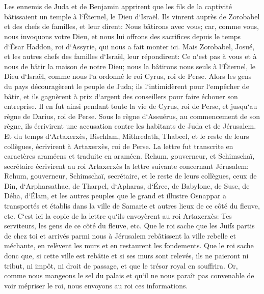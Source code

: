 \chapter{}

\verse Les ennemis de Juda et de Benjamin apprirent que les fils de la captivité bâtissaient un temple à l`Éternel, le Dieu d`Israël. 
\verse Ils vinrent auprès de Zorobabel et des chefs de familles, et leur dirent: Nous bâtirons avec vous; car, comme vous, nous invoquons votre Dieu, et nous lui offrons des sacrifices depuis le temps d`Ésar Haddon, roi d`Assyrie, qui nous a fait monter ici. 
\verse Mais Zorobabel, Josué, et les autres chefs des familles d`Israël, leur répondirent: Ce n`est pas à vous et à nous de bâtir la maison de notre Dieu; nous la bâtirons nous seuls à l`Éternel, le Dieu d`Israël, comme nous l`a ordonné le roi Cyrus, roi de Perse. 
\verse Alors les gens du pays découragèrent le peuple de Juda; ils l`intimidèrent pour l`empêcher de bâtir, 
\verse et ils gagnèrent à prix d`argent des conseillers pour faire échouer son entreprise. Il en fut ainsi pendant toute la vie de Cyrus, roi de Perse, et jusqu`au règne de Darius, roi de Perse. 
\verse Sous le règne d`Assuérus, au commencement de son règne, ils écrivirent une accusation contre les habitants de Juda et de Jérusalem. 
\verse Et du temps d`Artaxerxès, Bischlam, Mithredath, Thabeel, et le reste de leurs collègues, écrivirent à Artaxerxès, roi de Perse. La lettre fut transcrite en caractères araméens et traduite en araméen. 
\verse Rehum, gouverneur, et Schimschaï, secrétaire écrivirent au roi Artaxerxès la lettre suivante concernant Jérusalem: 
\verse Rehum, gouverneur, Schimschaï, secrétaire, et le reste de leurs collègues, ceux de Din, d`Arpharsathac, de Tharpel, d`Apharas, d`Érec, de Babylone, de Suse, de Déha, d`Élam, 
\verse et les autres peuples que le grand et illustre Osnappar a transportés et établis dans la ville de Samarie et autres lieux de ce côté du fleuve, etc. 
\verse C`est ici la copie de la lettre qu`ils envoyèrent au roi Artaxerxès: Tes serviteurs, les gens de ce côté du fleuve, etc. 
\verse Que le roi sache que les Juifs partis de chez toi et arrivés parmi nous à Jérusalem rebâtissent la ville rebelle et méchante, en relèvent les murs et en restaurent les fondements. 
\verse Que le roi sache donc que, si cette ville est rebâtie et si ses murs sont relevés, ils ne paieront ni tribut, ni impôt, ni droit de passage, et que le trésor royal en souffrira. 
\verse Or, comme nous mangeons le sel du palais et qu`il ne nous paraît pas convenable de voir mépriser le roi, nous envoyons au roi ces informations. 

